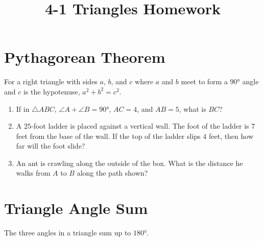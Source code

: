 \documentclass{article}
\title{4-1 Triangles Homework}
\date{}
\author{}
\begin{document}
\maketitle

\section*{Pythagorean Theorem}
For a right triangle with sides $a$, $b$, and $c$ where $a$ and $b$ meet to form a $\ang{90}$ angle and $c$ is the hypotenuse, $a^2 + b^2 = c^2$.

\begin{enumerate}
    \item If in $\triangle ABC$, $\angle A + \angle B = \ang{90}$, $AC = 4$, and $AB = 5$, what is $BC$?
        \vspace{3cm}
    \item A $25$-foot ladder is placed against a vertical wall.
        The foot of the ladder is $7$ feet from the base of the wall.
        If the top of the ladder slips $4$ feet, then how far will the foot slide?
        \vspace{3cm}
    \item An ant is crawling along the outside of the box.
        What is the distance he walks from $A$ to $B$ along the path shown?
        \begin{center}
        \end{center}
        \vspace{3cm}
\end{enumerate}

\newpage

\section*{Triangle Angle Sum}
The three angles in a triangle sum up to $\ang{180}$.
\end{document}
